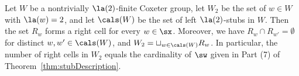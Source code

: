 \begin{thm}
    \label{thm:cellParameterization}
    Let $W$ be a nontrivially $\la(2)$-finite Coxeter group, let $W_2$ be the set of $w\in W$ with $\la(w)=2$, and let
    $\cals(W)$ be the set of left $\la(2)$-stubs in $W$.  Then the set $R_w$ forms a right \kl cell
    for every $w\in \sx$.  Moreover, we have  $R_w\cap R_{w'}=\emptyset$ for distinct
    $w,w'\in\cals(W)$, and $W_2=\sqcup_{w\in \cals(W)}R_w$. In particular, the number of right cells
    in $W_2$ equals the cardinality of $\sw$ given in Part \textup{(}7\textup{)} of
    Theorem~\ref{thm:stubDescription}.
\end{thm}
